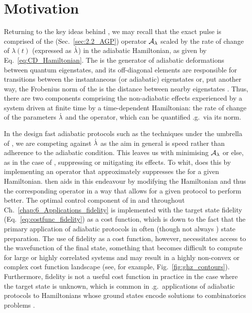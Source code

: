 \section{Motivation}\label{sec:5.1_motivation}

Returning to the key ideas behind , we may recall that the exact  pulse is comprised of the  (Sec.~\ref{sec:2.2_AGP}) operator $\mathcal{A}_{\lambda}$ scaled by the rate of change of $\lambda(t)$ (expressed as $\dot{\lambda}$) in the adiabatic Hamiltonian, as given by Eq.~\eqref{eq:CD_Hamiltonian}. The  is the generator of adiabatic deformations between quantum eigenstates, and its off-diagonal elements are responsible for transitions between the instantaneous (or adiabatic) eigenstates or, put another way, the Frobenius norm of the  is the distance between nearby eigenstates \cite{pandey_adiabatic_2020, nandy_delayed_2022}. Thus, there are two components comprising the non-adiabatic effects experienced by a system driven at finite time by a time-dependent Hamiltonian: the rate of change of the parameters $\dot{\lambda}$ and the  operator, which can be quantified \@e.g.~via its norm. 

In the design fast adiabatic protocols such as the techniques under the umbrella of , we are competing against $\dot{\lambda}$ as the aim in general is speed rather than adherence to the adiabatic condition. This leaves us with minimising $\mathcal{A}_{\lambda}$ or else, as in the case of , suppressing or mitigating its effects. To whit,  does this by implementing an operator that approximately suppresses the  for a given Hamiltonian.  then aids in this endeavour by modifying the Hamiltonian and thus the corresponding  operator in a way that allows for a given  protocol to perform better. The optimal control component of  in \cite{cepaite_counterdiabatic_2023} and throughout Ch.~\ref{chap:6_Applications_fidelity} is implemented with the target state fidelity (Eq.~\eqref{eq:costfunc_fidelity}) as a cost function, which is down to the fact that the primary application of adiabatic protocols in often (though not always \cite{pelegri_high-fidelity_2022}) state preparation. The use of fidelity as a cost function, however, necessitates access to the wavefunction of the final state, something that becomes difficult to compute for large or highly correlated systems and may result in a highly non-convex or complex cost function landscape (see, for example, Fig.~\ref{fig:ghz_contours}). Furthermore, fidelity is not a useful cost function in practice in the case where the target state is unknown, which is common in \@e.g.~applications of adiabatic protocols to Hamiltonians whose ground states encode solutions to combinatorics problems \cite{ebadi_quantum_2022, albash_adiabatic_2018}. 

